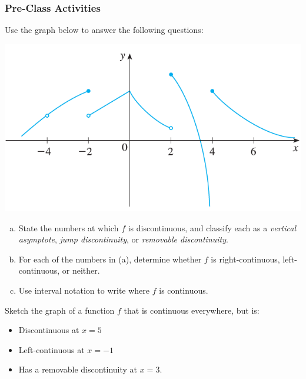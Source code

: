 \documentclass[notes]{subfiles}
\begin{document}
			\newpage
		
		\subsubsection*{Pre-Class Activities}
		\begin{ex}
			Use the graph below to answer the following questions:\\
			\begin{minipage}{3in}
				\includegraphics[scale = .58]{1.8fig1}
			\end{minipage}
			\begin{minipage}{3.8in}
				\begin{enumerate}[(a)]
					\item State the numbers at which $f$ is discontinuous, and classify each as a \emph{vertical asymptote}, \emph{jump discontinuity}, or \emph{removable discontinuity}.
					\item For each of the numbers in (a), determine whether $f$ is right-continuous, left-continuous, or neither.  
					\item Use interval notation to write where $f$ is continuous.
				\end{enumerate}
			\end{minipage}
		\end{ex}
			
		\begin{ex}
			Sketch the graph of a function $f$ that is continuous everywhere, but is:
				\begin{itemize}
					\item Discontinuous at $x = 5$
					\item Left-continuous at $x = -1$
					\item Has a removable discontinuity at $x = 3$.
				\end{itemize}
		\end{ex}
\end{document}
